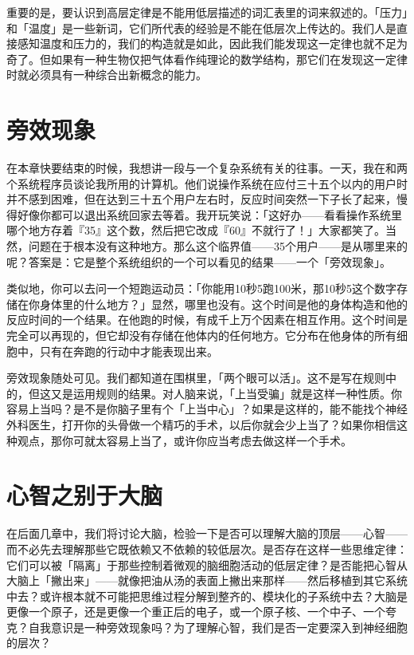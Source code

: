 \documentclass[
  12pt,
  twoside,
  openright,
  oldfontcommands,
]{memoir}
\begin{document}
重要的是，要认识到高层定律是不能用低层描述的词汇表里的词来叙述的。「压力」和「温度」是一些新词，它们所代表的经验是不能在低层次上传达的。我们人是直接感知温度和压力的，我们的构造就是如此，因此我们能发现这一定律也就不足为奇了。但如果有一种生物仅把气体看作纯理论的数学结构，那它们在发现这一定律时就必须具有一种综合出新概念的能力。

\section{旁效现象}

在本章快要结束的时候，我想讲一段与一个复杂系统有关的往事。一天，我在和两个系统程序员谈论我所用的计算机。他们说操作系统在应付三十五个以内的用户时并不感到困难，但在达到三十五个用户左右时，反应时间突然一下子长了起来，慢得好像你都可以退出系统回家去等着。我开玩笑说：「这好办------看看操作系统里哪个地方存着『35』这个数，然后把它改成『60』不就行了！」大家都笑了。当然，问题在于根本没有这种地方。那么这个临界值------35个用户------是从哪里来的呢？答案是：它是整个系统组织的一个可以看见的结果------一个「旁效现象」。

类似地，你可以去问一个短跑运动员：「你能用10秒5跑100米，那10秒5这个数字存储在你身体里的什么地方？」显然，哪里也没有。这个时间是他的身体构造和他的反应时间的一个结果。在他跑的时候，有成千上万个因素在相互作用。这个时间是完全可以再现的，但它却没有存储在他体内的任何地方。它分布在他身体的所有细胞中，只有在奔跑的行动中才能表现出来。

旁效现象随处可见。我们都知道在围棋里，「两个眼可以活」。这不是写在规则中的，但这又是运用规则的结果。对人脑来说，「上当受骗」就是这样一种性质。你容易上当吗？是不是你脑子里有个「上当中心」？如果是这样的，能不能找个神经外科医生，打开你的头骨做一个精巧的手术，以后你就会少上当了？如果你相信这种观点，那你可就太容易上当了，或许你应当考虑去做这样一个手术。

\section{心智之别于大脑}

在后面几章中，我们将讨论大脑，检验一下是否可以理解大脑的顶层------心智------而不必先去理解那些它既依赖又不依赖的较低层次。是否存在这样一些思维定律：它们可以被「隔离」于那些控制着微观的脑细胞活动的低层定律？是否能把心智从大脑上「撇出来」------就像把油从汤的表面上撇出来那样------然后移植到其它系统中去？或许根本就不可能把思维过程分解到整齐的、模块化的子系统中去？大脑是更像一个原子，还是更像一个重正后的电子，或一个原子核、一个中子、一个夸克？自我意识是一种旁效现象吗？为了理解心智，我们是否一定要深入到神经细胞的层次？
\end{document}
